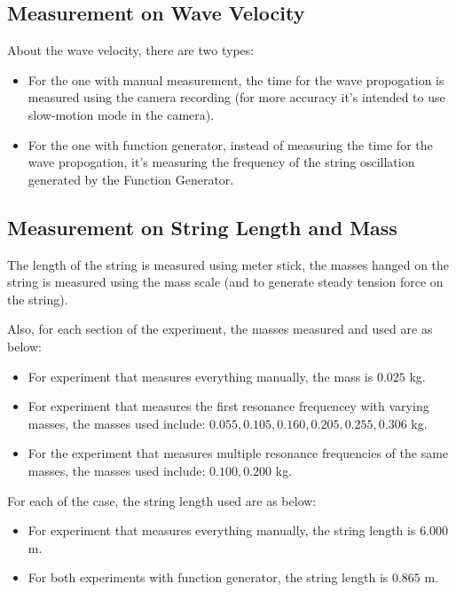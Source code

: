 \documentclass{article}
\begin{document}
\subsection{Measurement on Wave Velocity}
About the wave velocity, there are two types:
\begin{itemize}
    \item For the one with manual measurement, the time for the wave propogation is measured using the camera recording (for more accuracy it's intended to use slow-motion mode in the camera).
    \item For the one with function generator, instead of measuring the time for the wave propogation, it's measuring the frequency of the string oscillation generated by the Function Generator.
\end{itemize}

\hfill

\subsection{Measurement on String Length and Mass}
The length of the string is measured using meter stick, the masses hanged on the string is measured using the mass scale (and to generate steady tension force on the string).

Also, for each section of the experiment, the masses measured and used are as below:
\begin{itemize}
    \item For experiment that measures everything manually, the mass is $0.025$ kg.
    \item For experiment that measures the first resonance frequencey with varying masses, the masses used include: $0.055,0.105,0.160,0.205,0.255,0.306$ kg.
    \item For the experiment that measures multiple resonance frequencies of the same masses, the masses used include: $0.100, 0.200$ kg.  
\end{itemize}

For each of the case, the string length used are as below:
\begin{itemize}
    \item For experiment that measures everything manually, the string length is $6.000$ m.
    \item For both experiments with function generator, the string length is $0.865$ m.
\end{itemize}

\newpage
\end{document}
